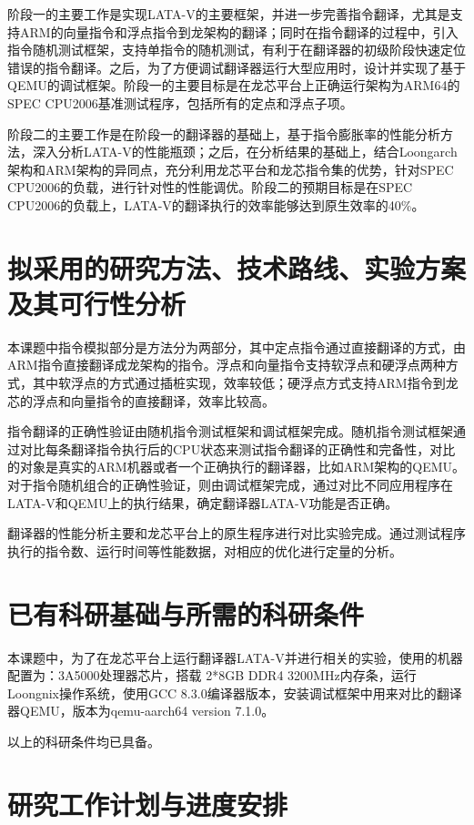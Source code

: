 阶段一的主要工作是实现LATA-V的主要框架，并进一步完善指令翻译，尤其是支持ARM的向量指令和浮点指令到龙架构的翻译；同时在指令翻译的过程中，引入指令随机测试框架，支持单指令的随机测试，有利于在翻译器的初级阶段快速定位错误的指令翻译。之后，为了方便调试翻译器运行大型应用时，设计并实现了基于QEMU的调试框架。阶段一的主要目标是在龙芯平台上正确运行架构为ARM64的SPEC CPU2006基准测试程序，包括所有的定点和浮点子项。

阶段二的主要工作是在阶段一的翻译器的基础上，基于指令膨胀率的性能分析方法，深入分析LATA-V的性能瓶颈；之后，在分析结果的基础上，结合Loongarch架构和ARM架构的异同点，充分利用龙芯平台和龙芯指令集的优势，针对SPEC CPU2006的负载，进行针对性的性能调优。阶段二的预期目标是在SPEC CPU2006的负载上，LATA-V的翻译执行的效率能够达到原生效率的40{\%}。
\section{拟采用的研究方法、技术路线、实验方案及其可行性分析}
本课题中指令模拟部分是方法分为两部分，其中定点指令通过直接翻译的方式，由ARM指令直接翻译成龙架构的指令。浮点和向量指令支持软浮点和硬浮点两种方式，其中软浮点的方式通过插桩实现，效率较低；硬浮点方式支持ARM指令到龙芯的浮点和向量指令的直接翻译，效率比较高。

指令翻译的正确性验证由随机指令测试框架和调试框架完成。随机指令测试框架通过对比每条翻译指令执行后的CPU状态来测试指令翻译的正确性和完备性，对比的对象是真实的ARM机器或者一个正确执行的翻译器，比如ARM架构的QEMU。对于指令随机组合的正确性验证，则由调试框架完成，通过对比不同应用程序在LATA-V和QEMU上的执行结果，确定翻译器LATA-V功能是否正确。

翻译器的性能分析主要和龙芯平台上的原生程序进行对比实验完成。通过测试程序执行的指令数、运行时间等性能数据，对相应的优化进行定量的分析。
\section{已有科研基础与所需的科研条件}

本课题中，为了在龙芯平台上运行翻译器LATA-V并进行相关的实验，使用的机器配置为：3A5000处理器芯片，搭载 2*8GB DDR4 3200MHz内存条，运行Loongnix操作系统，使用GCC 8.3.0编译器版本，安装调试框架中用来对比的翻译器QEMU，版本为qemu-aarch64 version 7.1.0。

以上的科研条件均已具备。

\section{研究工作计划与进度安排}

